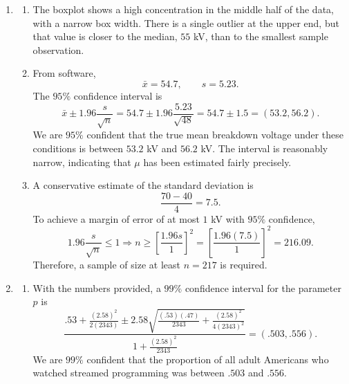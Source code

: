\documentclass[12pt]{article}
\begin{document}
\begin{enumerate}[label=\textbf{\arabic*.}, leftmargin=*]
\begin{enumerate}[label=\alph*.]
    \item A $99\%$ confidence level requires critical values that capture area $.005$ in each tail of the chi-squared curve with $30$ df. These are $13.787$ and $53.672$, which replace $16.791$ and $46.979$ in part (a).

    \item
    \[
    V(X)=\frac{1}{\lambda^2}
    \]
    when $X$ has an exponential distribution, so the standard deviation is
    \[
    \frac{1}{\lambda},
    \]
    the same as the mean. Thus the interval in part (a) is also a $95\%$ confidence interval for the standard deviation of the lifetime distribution.
\end{enumerate}

\setcounter{enumi}{15}
\item
\begin{enumerate}[label=\alph*.]
    \item The boxplot shows a high concentration in the middle half of the data, with a narrow box width. There is a single outlier at the upper end, but that value is closer to the median, $55$ kV, than to the smallest sample observation.

    \item From software,
    \[
    \bar{x}=54.7,\qquad s=5.23.
    \]
    The $95\%$ confidence interval is
    \[
    \bar{x}\pm1.96\frac{s}{\sqrt{n}}
    =54.7\pm1.96\frac{5.23}{\sqrt{48}}
    =54.7\pm1.5=(53.2,56.2).
    \]
    We are $95\%$ confident that the true mean breakdown voltage under these conditions is between $53.2$ kV and $56.2$ kV. The interval is reasonably narrow, indicating that $\mu$ has been estimated fairly precisely.

    \item A conservative estimate of the standard deviation is
    \[
    \frac{70-40}{4}=7.5.
    \]
    To achieve a margin of error of at most $1$ kV with $95\%$ confidence,
    \[
    1.96\frac{s}{\sqrt{n}}\le1
    \Rightarrow
    n\ge\left[\frac{1.96s}{1}\right]^2
    =\left[\frac{1.96(7.5)}{1}\right]^2=216.09.
    \]
    Therefore, a sample of size at least $n=217$ is required.
\end{enumerate}

\setcounter{enumi}{19}
\item
\begin{enumerate}[label=\alph*.]
    \item With the numbers provided, a $99\%$ confidence interval for the parameter $p$ is
    \[
    \frac{.53+\frac{(2.58)^2}{2(2343)}\pm 2.58\sqrt{\frac{(.53)(.47)}{2343}+\frac{(2.58)^2}{4(2343)^2}}}{1+\frac{(2.58)^2}{2343}}
    =(.503,.556).
    \]
    We are $99\%$ confident that the proportion of all adult Americans who watched streamed programming was between $.503$ and $.556$.


\end{enumerate}
\end{enumerate}
\end{document}

